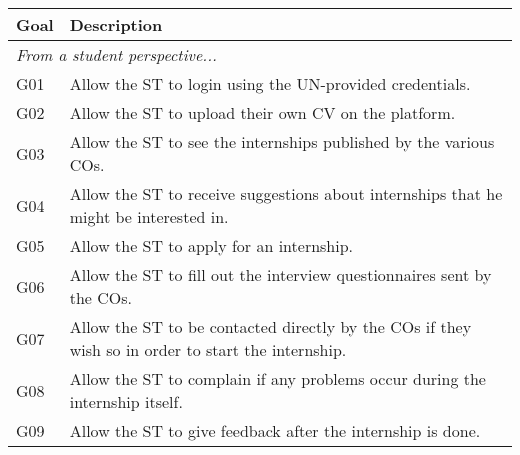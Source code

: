 \begin{table}[H]
    \centering
    \begin{longtable}{|l|p{}|}
        \hline
        \textbf{Goal} & \textbf{Description}                                                                                                                              \\
        \hline \hline
        \multicolumn{2}{|l|}{\textit{From a student perspective...}}                                                                                                      \\
        \hline
        G01           & Allow the ST to login using the UN-provided credentials.                                                                                          \\
        \hline
        G02           & Allow the ST to upload their own CV on the platform.                                                                                              \\
        \hline
        G03           & Allow the ST to see the internships published by the various COs.                                                                                 \\
        \hline
        G04           & Allow the ST to receive suggestions about internships that he might be interested in.                                                             \\
        \hline
        G05           & Allow the ST to apply for an internship.                                                                                                          \\
        \hline
        G06           & Allow the ST to fill out the interview questionnaires sent by the COs.                                                                            \\
        \hline
        G07           & Allow the ST to be contacted directly by the COs if they wish so in order to start the internship.                                                \\
        \hline
        G08           & Allow the ST to complain if any problems occur during the internship itself.                                                                      \\
        \hline
        G09           & Allow the ST to give feedback after the internship is done.                                                                                       \\

\end{longtable}
\end{table}
